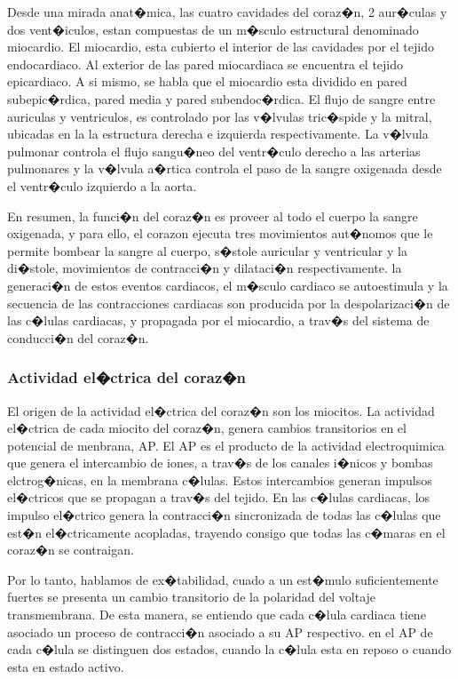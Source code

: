 Desde una mirada anat�mica, las cuatro cavidades del coraz�n, 2 aur�culas y
dos vent�iculos, estan compuestas de un m�sculo estructural denominado
miocardio. El miocardio, esta cubierto el interior de las cavidades por el
tejido endocardiaco. Al exterior de las pared miocardiaca se encuentra el tejido
epicardiaco. A si mismo, se habla que el miocardio esta dividido en
pared subepic�rdica, pared media y pared subendoc�rdica. El flujo de sangre
entre auriculas y ventriculos, es controlado por las v�lvulas tric�spide  y la
mitral, ubicadas en la la estructura derecha e izquierda respectivamente.
La v�lvula pulmonar controla el flujo sangu�neo del ventr�culo derecho a las
arterias pulmonares y la v�lvula a�rtica controla el paso de la sangre oxigenada
desde el ventr�culo izquierdo a la aorta.

En resumen, la funci�n del coraz�n es proveer al todo el cuerpo la sangre
oxigenada, y para ello, el corazon ejecuta tres movimientos aut�nomos que le
permite bombear la sangre al cuerpo, s�stole auricular y ventricular y  la
di�stole, movimientos de contracci�n y dilataci�n respectivamente. la generaci�n
de estos eventos cardiacos, el m�sculo cardiaco se autoestimula y la secuencia
de las contracciones cardiacas son producida  por la despolarizaci�n de las
c�lulas cardiacas, y  propagada por el miocardio, a trav�s del sistema de
conducci�n del coraz�n.



\subsubsection{Actividad el�ctrica del coraz�n }

El origen de la actividad el�ctrica del coraz�n son los miocitos. La actividad
el�ctrica de cada miocito del coraz�n, genera cambios transitorios en el
potencial de menbrana, \ac{AP}. El \ac{AP} es el producto de la actividad
electroquimica que genera el intercambio de iones, a trav�s de los canales
i�nicos  y bombas elctrog�nicas, en la membrana c�lulas. Estos intercambios
generan impulsos el�ctricos que se propagan a trav�s del tejido. En las c�lulas
cardiacas, los impulso el�ctrico genera la contracci�n sincronizada de todas
las c�lulas  que est�n el�ctricamente acopladas, trayendo consigo que todas las
c�maras en el coraz�n se contraigan.

Por lo tanto, hablamos de ex�tabilidad, cuado a un est�mulo suficientemente
fuertes se presenta un cambio transitorio de la polaridad del voltaje
transmembrana. De esta manera, se entiendo que cada c�lula cardiaca tiene
asociado un proceso de contracci�n asociado a su \ac{AP} respectivo. en el
\ac{AP} de cada c�lula se distinguen dos estados, cuando la c�lula esta en
reposo o cuando esta en estado activo.

